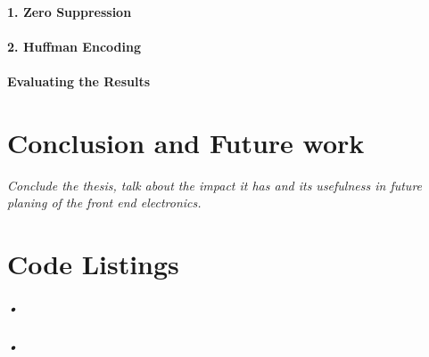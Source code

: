 \documentclass[a4paper, 12pt]{report}
\begin{document}
\subsubsection{1. Zero Suppression}
\subsubsection{2. Huffman Encoding}
\subsubsection{Evaluating the Results}


\chapter{Conclusion and Future work}
\textit{Conclude the thesis, talk about the impact it has and its usefulness in future planing of the front end electronics.}

\appendix
\chapter{Code Listings}
\label{cha:app-code}

\paragraph{•}
\begin{minipage}{\linewidth}

\end{minipage}

\paragraph{•}
\begin{minipage}{\linewidth}

\end{minipage}

{}

\end{document}
